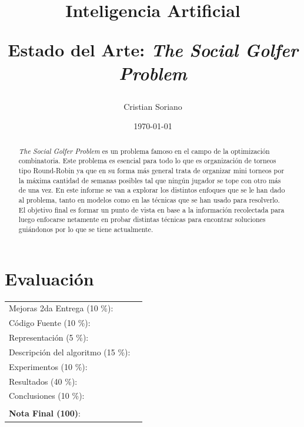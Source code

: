 \documentclass[letter, 10pt]{article}
\begin{document}
\title{Inteligencia Artificial \\ \begin{Large}Estado del Arte: \textit{The Social Golfer Problem}\end{Large}}
\author{Cristian Soriano}
\date{\today}
\maketitle


\section*{Evaluaci\'on}

\begin{tabular}{ll}
Mejoras 2da Entrega (10 \%): &  \underline{\hspace{2cm}}\\
C\'odigo Fuente (10 \%): &  \underline{\hspace{2cm}}\\
Representaci\'on (5 \%):  & \underline{\hspace{2cm}} \\
Descripci\'on del algoritmo (15 \%):  & \underline{\hspace{2cm}} \\
Experimentos (10 \%):  & \underline{\hspace{2cm}} \\
Resultados (40 \%):  & \underline{\hspace{2cm}} \\
Conclusiones (10 \%): &  \underline{\hspace{2cm}}\\
 &  \\
\textbf{Nota Final (100)}:   & \underline{\hspace{2cm}}
\end{tabular}
\vspace{2cm}


\begin{abstract}
\textit{The Social Golfer Problem} es un problema famoso en el campo de la optimización combinatoria. Este problema es esencial para todo lo que es organización de torneos tipo Round-Robin ya que en su forma más general trata de organizar mini torneos por la máxima cantidad de semanas posibles tal que ningún jugador se tope con otro más de una vez. En este informe se van a explorar los distintos enfoques que se le han dado al problema, tanto en modelos como en las técnicas que se han usado para resolverlo. El objetivo final es formar un punto de vista en base a la información recolectada para luego enfocarse netamente en probar distintas técnicas para encontrar soluciones guiándonos por lo que se tiene actualmente.
\end{abstract}
\end{document}
